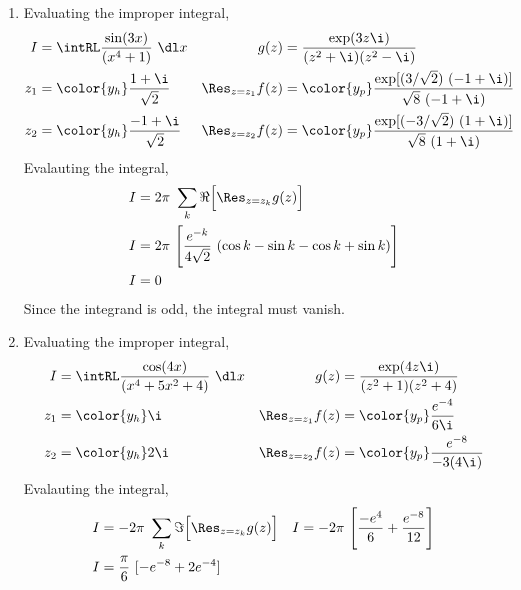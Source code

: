 \begin{enumerate}
    \item Evaluating the improper integral,
          \begin{align}
              I                   & = \intRL \frac{\sin(3x)}{(x^4 + 1)}\ \dl x &
              g(z)                & = \frac{\exp(3z\i)}{(z^2 + \i)(z^2 - \i)}    \\
              z_1                 & = \color{y_h} \frac{1 + \i}{\sqrt{2}}      &
              \Res_{z = z_1} f(z) & = \color{y_p} \frac{\exp[(3/\sqrt{2})
                      \ (-1 + \i)]}
              {\sqrt{8}\ (-1 + \i)}                                              \\
              z_2                 & = \color{y_h} \frac{-1 + \i}{\sqrt{2}}     &
              \Res_{z = z_2} f(z) & = \color{y_p} \frac{\exp[(-3/\sqrt{2})
                      \ (1 + \i)]}
              {\sqrt{8}\ (1 + \i)}
          \end{align}
          Evalauting the integral,
          \begin{align}
              I & = 2\pi\ \sum_{k} \Re{\Big[\Res_{z = z_k} g(z)\Big]}                \\
              I & = 2\pi\ \Bigg[ \frac{e^{-k}}{4\sqrt{2}}\ (\cos k - \sin k - \cos k
              + \sin k) \Bigg]                                                       \\
              I & = 0
          \end{align}
          Since the integrand is odd, the integral must vanish.

    \item Evaluating the improper integral,
          \begin{align}
              I                   & = \intRL \frac{\cos(4x)}{(x^4 + 5x^2 + 4)}\ \dl x &
              g(z)                & = \frac{\exp(4z\i)}{(z^2 + 1)(z^2 + 4)}             \\
              z_1                 & = \color{y_h} \i                                  &
              \Res_{z = z_1} f(z) & = \color{y_p} \frac{e^{-4}}{6\i}                    \\
              z_2                 & = \color{y_h} 2\i                                 &
              \Res_{z = z_2} f(z) & = \color{y_p} \frac{e^{-8}}{-3(4\i)}
          \end{align}
          Evalauting the integral,
          \begin{align}
              I & = -2\pi\ \sum_{k} \Im{\Big[\Res_{z = z_k} g(z)\Big]}      &
              I & = -2\pi\ \Bigg[ \frac{-e^4}{6} + \frac{e^{-8}}{12} \Bigg]   \\
              I & = \frac{\pi}{6}\ [-e^{-8} + 2e^{-4}]
          \end{align}


\end{enumerate}

